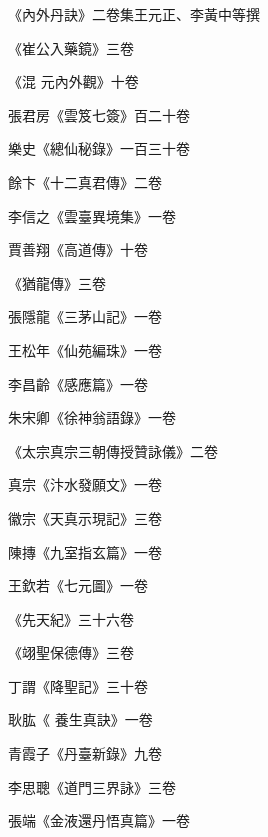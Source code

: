 \begin{pinyinscope}
 《內外丹訣》二卷集王元正、李黃中等撰



 《崔公入藥鏡》三卷



 《混
 元內外觀》十卷



 張君房《雲笈七簽》百二十卷



 樂史《總仙秘錄》一百三十卷



 餘卞《十二真君傳》二卷



 李信之《雲臺異境集》一卷



 賈善翔《高道傳》十卷



 《猶龍傳》三卷



 張隱龍《三茅山記》一卷



 王松年《仙苑編珠》一卷



 李昌齡《感應篇》一卷



 朱宋卿《徐神翁語錄》一卷



 《太宗真宗三朝傳授贊詠儀》二卷



 真宗《汴水發願文》一卷



 徽宗《天真示現記》三卷



 陳摶《九室指玄篇》一卷



 王欽若《七元圖》一卷



 《先天紀》三十六卷



 《翊聖保德傳》三卷



 丁謂《降聖記》三十卷



 耿肱《
 養生真訣》一卷



 青霞子《丹臺新錄》九卷



 李思聰《道門三界詠》三卷



 張端《金液還丹悟真篇》一卷




\end{pinyinscope}
